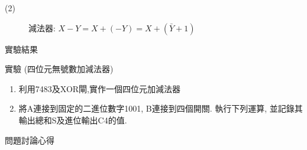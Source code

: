 \documentclass[12pt, a4paper]{article}
\begin{document}
\begin{description}
\begin{enumerate}
\begin{description}
                  \item [(2)] 減法器: $X - Y = X + (-Y) = X + (\bar{Y} + 1)$
                \normalsize  
              \end{description}
        \normalsize
      \end{enumerate}
    \item [二、]實驗結果
      \begin{description}
        \fontsize{20pt}{22pt}\selectfont
        \item 實驗 (四位元無號數加減法器)
          \fontsize{16pt}{19.2pt}\selectfont
            \begin{enumerate}
              \item 利用7483及XOR閘,實作一個四位元加減法器
              \item 將A連接到固定的二進位數字1001, B連接到四個開關. 執行下列運算, 並記錄其輸出總和S及進位輸出C4的值.
            \end{enumerate}
          \normalsize  
        \normalsize
      \end{description}
    \item [三、]問題討論心得
  \normalsize
\end{description}
\end{document}
